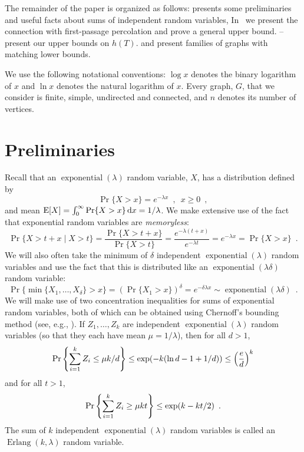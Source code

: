 \documentclass{patmorin}
\DeclareMathOperator{\exponential}{exponential}
\DeclareMathOperator{\erlang}{Erlang}
\begin{document}
The remainder of the paper is organized as follows: 
 presents some preliminaries
and useful facts about sums of independent  random variables,
In~ we present the connection with first-passage percolation and prove a general upper bound.
-- present our
upper bounds on $h(T)$.  
 and
present families of
graphs with matching lower bounds.

We use the following notational conventions: $\log x$ denotes the binary
logarithm of $x$ and $\ln x$ denotes the natural logarithm of $x$.
Every graph, $G$, that we consider
is finite, simple, undirected and connected, and $n$ denotes its number of vertices.

\section{Preliminaries}
\label{sec:prelim}

Recall that an $\exponential(\lambda)$ random variable, $X$, has a
distribution defined by
\[
   \Pr\{X>x\} = e^{-\lambda x}  \enspace , \enspace x\ge 0 \enspace ,
\]
and mean $\mathrm{E}[X] = \int_0^{\infty}
\Pr\{X>x\}\,\mathrm{d}x = 1/\lambda$.  We make extensive use of the fact
that exponential random variables are \emph{memoryless}:
\[
    \Pr\{X > t+x\mid X>t\} = \frac{\Pr\{X> t+x\}}{\Pr\{X > t\}}
           = \frac{e^{-\lambda(t+x)}}{e^{-\lambda t}} = e^{-\lambda x} = \Pr\{X > x\} \enspace .
\]
We will also often take the minimum of $\delta$ independent $\exponential(\lambda)$ random variables and use the fact that this is distributed like an
$\exponential(\lambda \delta)$ random variable:
\[
   \Pr\{\min\{X_1,\ldots,X_\delta\} > x\} 
      = (\Pr\{X_1 > x\})^{\delta}
      = e^{-\delta\lambda x} \sim \exponential(\lambda \delta) \enspace .
\]
We will make use of two concentration inequalities for sums of exponential random
variables, both of which can be obtained using Chernoff's bounding
method (see, e.g., \cite[Theorem~5.1]{janson}).  If $Z_1,\ldots,Z_k$ are independent $\exponential(\lambda)$
random variables (so that they each have mean $\mu=1/\lambda$), then
for all $d>1$,
\begin{equation}
    \Pr\left\{\sum_{i=1}^k Z_i \le \mu k/d\right\} \le \exp(-k(\ln d -1 + 1/d)) \le \left(\frac{e}{d}\right)^k  \eqlabel{head-bound}
\end{equation}
and for all $t>1$, 
\begin{equation}
    \Pr\left\{\sum_{i=1}^k Z_i \ge \mu k t\right\} \le \exp (k-kt/2) \enspace . \eqlabel{tail-bound}
\end{equation}
The sum of $k$ independent $\exponential(\lambda)$
random variables is called an $\erlang(k,\lambda)$ random variable.
\end{document}
